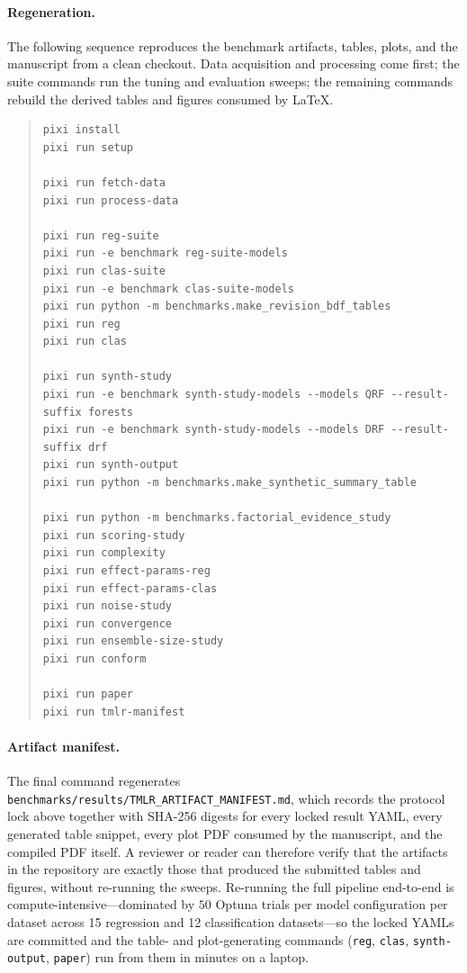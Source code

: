 \paragraph{Regeneration.}
The following sequence reproduces the benchmark artifacts, tables, plots, and the manuscript from a clean checkout. Data acquisition and processing come first; the suite commands run the tuning and evaluation sweeps; the remaining commands rebuild the derived tables and figures consumed by \LaTeX.

\begin{quote}
\small
\begin{verbatim}
pixi install
pixi run setup

pixi run fetch-data
pixi run process-data

pixi run reg-suite
pixi run -e benchmark reg-suite-models
pixi run clas-suite
pixi run -e benchmark clas-suite-models
pixi run python -m benchmarks.make_revision_bdf_tables
pixi run reg
pixi run clas

pixi run synth-study
pixi run -e benchmark synth-study-models --models QRF --result-suffix forests
pixi run -e benchmark synth-study-models --models DRF --result-suffix drf
pixi run synth-output
pixi run python -m benchmarks.make_synthetic_summary_table

pixi run python -m benchmarks.factorial_evidence_study
pixi run scoring-study
pixi run complexity
pixi run effect-params-reg
pixi run effect-params-clas
pixi run noise-study
pixi run convergence
pixi run ensemble-size-study
pixi run conform

pixi run paper
pixi run tmlr-manifest
\end{verbatim}
\end{quote}

\paragraph{Artifact manifest.}
The final command regenerates \texttt{benchmarks/results/TMLR\_ARTIFACT\_MANIFEST.md}, which records the protocol lock above together with SHA-256 digests for every locked result YAML, every generated table snippet, every plot PDF consumed by the manuscript, and the compiled PDF itself. A reviewer or reader can therefore verify that the artifacts in the repository are exactly those that produced the submitted tables and figures, without re-running the sweeps. Re-running the full pipeline end-to-end is compute-intensive---dominated by $50$ Optuna trials per model configuration per dataset across 15 regression and 12 classification datasets---so the locked YAMLs are committed and the table- and plot-generating commands (\texttt{reg}, \texttt{clas}, \texttt{synth-output}, \texttt{paper}) run from them in minutes on a laptop.

